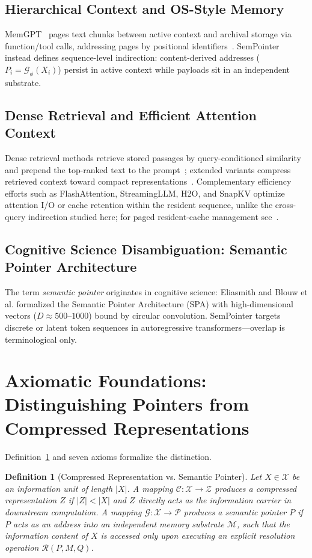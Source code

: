 \documentclass[conference]{IEEEtran}
\newtheorem{definition}{Definition}
\begin{document}
\subsection{Hierarchical Context and OS-Style Memory}
MemGPT~\cite{packer2023memgpt} pages text chunks between active context and archival storage via function/tool calls, addressing pages by positional identifiers~\cite{packer2023memgpt}. SemPointer instead defines sequence-level indirection: content-derived addresses ($P_i = \mathcal{G}_\phi(X_i)$) persist in active context while payloads sit in an independent substrate.

\subsection{Dense Retrieval and Efficient Attention Context}
Dense retrieval methods retrieve stored passages by query-conditioned similarity and prepend the top-ranked text to the prompt~\cite{lewis2020rag}; extended variants compress retrieved context toward compact representations~\cite{cheng2024xrag}. Complementary efficiency efforts such as FlashAttention, StreamingLLM, H2O, and SnapKV optimize attention I/O or cache retention within the resident sequence, unlike the cross-query indirection studied here; for paged resident-cache management see~\cite{kwon2023pagedattention}.

\subsection{Cognitive Science Disambiguation: Semantic Pointer Architecture}
The term \textit{semantic pointer} originates in cognitive science: Eliasmith \cite{eliasmith2013mind} and Blouw et al. \cite{blouw2016concepts} formalized the Semantic Pointer Architecture (SPA) with high-dimensional vectors ($D \approx 500$--$1000$) bound by circular convolution. SemPointer targets discrete or latent token sequences in autoregressive transformers---overlap is terminological only.

\section{Axiomatic Foundations: Distinguishing Pointers from Compressed Representations}

Definition~\ref{def:pointer} and seven axioms formalize the distinction.

\begin{definition}[Compressed Representation vs. Semantic Pointer]\label{def:pointer}
Let $X \in \mathcal{X}$ be an information unit of length $|X|$. A mapping $\mathcal{C}: \mathcal{X} \to \mathcal{Z}$ produces a compressed representation $Z$ if $|Z| < |X|$ and $Z$ directly acts as the information carrier in downstream computation. A mapping $\mathcal{G}: \mathcal{X} \to \mathcal{P}$ produces a semantic pointer $P$ if $P$ acts as an address into an independent memory substrate $\mathcal{M}$, such that the information content of $X$ is accessed only upon executing an explicit resolution operation $\mathcal{R}(P, M, Q)$.
\end{definition}
\end{document}
